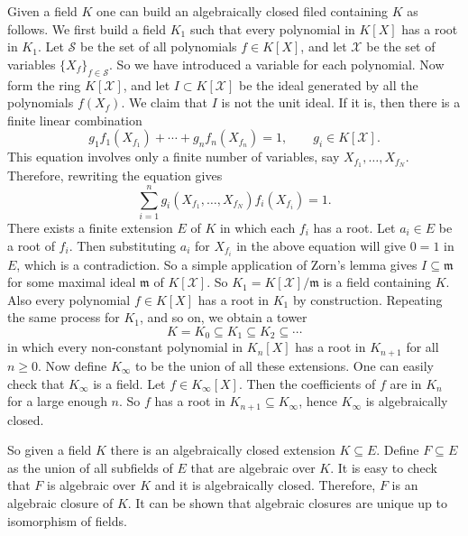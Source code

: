 Given a field $K$ one can build an algebraically closed filed containing $K$ as 
follows. We first build a field $K_1$ such that every polynomial in $K[X]$ has a root in $K_1$. Let 
$\mathcal{S}$ be the set of all polynomials $f \in K[X]$, and let $\mathcal{X}$ be the set of 
variables $\{X_f\}_{f \in \mathcal{S}}$. So we have introduced a variable for each polynomial. Now 
form the ring $K[\mathcal{X}]$, and let $I \subset K[\mathcal{X}]$ be the ideal generated by all 
the polynomials $f(X_f)$. We claim that $I$ is not the unit ideal. If it is, then there is a finite 
linear combination
\[ g_1f_1(X_{f_1}) + \cdots + g_nf_n(X_{f_n}) = 1, \qquad g_i \in K[\mathcal{X}]. \]
This equation involves only a finite number of variables, say $X_{f_1}, \dots, X_{f_N}$. Therefore, 
rewriting the equation gives
\[ \sum_{i = 1}^n g_i(X_{f_1}, \dots, X_{f_N})f_i(X_{f_i}) = 1. \]  
There exists a finite extension $E$ of $K$ in which each $f_i$ has a root. Let $a_i \in E$ be a 
root of $f_i$. Then substituting $a_i$ for $X_{f_i}$ in the above equation will give $0 = 1$ in 
$E$, which is a contradiction. So a simple application of Zorn's lemma gives $I \subseteq 
\mathfrak{m}$ for some maximal ideal $\mathfrak{m}$ of $K[\mathcal{X}]$. So $K_1 = K[\mathcal{X}] / 
\mathfrak{m}$ is a field containing $K$. Also every polynomial $f \in K[X]$ has a root in $K_1$ by 
construction. Repeating the same process for $K_1$, and so on, we obtain a tower
\[ K = K_0 \subseteq K_1 \subseteq K_2 \subseteq \cdots \]
in which every non-constant polynomial in $K_n[X]$ has a root in $K_{n + 1}$ for all $n \ge 0$. Now 
define $K_\infty$ to be the union of all these extensions. One can easily check that $K_\infty$ is 
a field. Let $f \in K_\infty[X]$. Then the coefficients of $f$ are in $K_n$ for a large enough $n$. 
So $f$ has a root in $K_{n + 1} \subseteq K_\infty$, hence $K_\infty$ is algebraically closed.

So given a field $K$ there is an algebraically closed extension $K \subseteq E$. Define $F 
\subseteq E$ as the union of all subfields of $E$ that are algebraic over $K$. It is easy to check 
that $F$ is algebraic over $K$ and it is algebraically closed. Therefore, $F$ is an algebraic 
closure of $K$. It can be shown that algebraic closures are unique up to isomorphism of fields.

